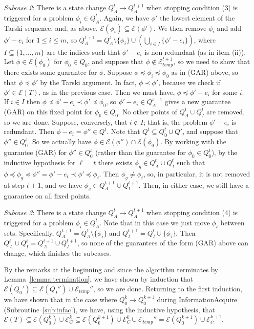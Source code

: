 \documentclass[11pt,reqno]{amsart}
\theoremstyle{definition}
\numberwithin{equation}{section}
\newcommand{\pre}{\phi}
\newcommand{\sub}{\subseteq}
\newcommand{\fix}{\mathcal{E}}
\newcommand{\peq}{\preceq}
\newcommand{\pe}{\prec}
\newcommand{\acto}{Q_0}
\newcommand{\actok}{Q_0^k}
\newcommand{\actokk}{Q_0^{k+1}}
\newcommand{\actot}{Q_0^t}
\newcommand{\actc}{Q_I}
\newcommand{\actat}{Q_A^t}
\newcommand{\actatt}{Q_A^{t + 1}}
\newcommand{\actct}{Q_I^t}
\newcommand{\actctt}{Q_I^{t + 1}}
\newcommand{\act}{Q}
\newcommand{\pren}{\pre_{0}}
\newcommand{\fixfindk}{\mathcal{E}^k_C}
\newcommand{\fixfindkk}{\mathcal{E}^{k + 1}_C}
\newcommand{\fixtemp}{\mathcal{E}_{temp}}
\newcommand{\fixtemptt}{\mathcal{E}^{t + 1}_{temp}}
\newcommand{\infacstoptwii}{(ii)\xspace}
\begin{document}
\emph{Subcase 2}: There is a state change $\actat \to \actatt$ when stopping condition (3) is triggered for a problem $\pre_i \in \actat$.
Again, we have $\pre'$ the lowest element of the Tarski sequence, and, as above, $\fix(\pre_i) \sub \fix(\pre')$.
We then remove $\pre_i$ and add $\pre' - e_i$ for $1 \leq i \leq m$, so $\actatt = \actat \setminus \{\pre_i \} \cup \left (\bigcup_{i \in I} \{\pre' - e_i \} \right )$, where $I \sub \{1,\hdots,m\}$ are the indices such that $\pre' - e_i$ is non-redundant (as in item \infacstoptwii).
Let $\pre \in \fix(\pren)$ for $\pren \in \acto$, and suppose that $\pre \not \in \fixtemptt$, so we need to show that there exists some guarantee for $\pre$.
Suppose $\pre \peq \pre_i \peq \pren$ as in (GAR) above, so that $\pre \peq \pre'$ by the Tarski argument.
In fact, $\pre \pe \pre'$, because we check if $\pre' \in \fix(T)$, as in the previous case.
Then we must have, $\pre \peq \pre' - e_i$ for some $i$.
If $i \in I$ then $\pre \peq \pre' - e_i \pe \pre' \peq \pren$, so $\pre' - e_i \in \actatt$ gives a new guarantee (GAR) on this fixed point for $\pren \in \acto$.
No other points of $\actat \cup \actct$ are removed, so we are done.
Suppose, conversely, that $i \not \in I$; that is, the problem $\pre' - e_i$ is redundant.
Then $\pre - e_i = \pre'' \in \act^t$. 
Note that $\act^t \sub \actot \cup \act'$, and suppose that $\pre'' \in \actot$.
So we actually have $\pre \in \fix(\pre'') \cap \fix(\pren)$.
By working with the guarantee (GAR) for $\pre'' \in \actot$ (rather than the guarantee for $\pren \in \actot$), by the inductive hypothesis for $\ell = t$ there exists $\pre_g \in \actat \cup \actct$ such that $\pre \peq \pre_g \peq \pre'' = \pre' - e_i \pe \pre' \peq \pre_i$.
Then $\pre_g \not = \pre_i$, so, in particular, it is not removed at step $t+1$, and we have $\pre_g \in \actatt \cup \actctt$.
Then, in either case, we still have a guarantee on all fixed points.

\emph{Subcase 3}: There is a state change $\actat \to \actatt$ when stopping condition (4) is triggered for a problem $\pre_i \in \actat$.
Note that in this case we just move $\pre_i$ between sets.
Specifically, $\actatt = \actat \setminus \{\pre_i\}$ and $\actctt = \actct \cup \{\pre_i\}$.
Then $\actat \cup \actct = \actatt \cup \actctt$, so none of the guarantees of the form (GAR) above can change, which finishes the subcases.

By the remarks at the beginning and since the algorithm terminates by Lemma~\ref{lemma:termination}, we have shown by induction that $\fix(\acto') \sub \fix(\actc'') \cup \fixtemp''$, so we are done.
Returning to the first induction, we have shown that in the case where $\actok \to \actokk$ during InformationAcquire (Subroutine~\ref{sub:infac}), we have, using the inductive hypothesis, that $\fix(T) \sub \fix(\actok) \cup \fixfindk \sub \fix(\actokk) \cup \fixfindk \cup \fixtemp'' = \fix(\actokk) \cup \fixfindkk$.
\end{document}
